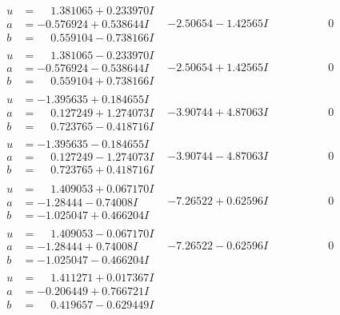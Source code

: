 \documentclass[1p]{elsarticle_modified}
\theoremstyle{definition}
\begin{document}
$$\begin{array}{c|c|c}
\begin{aligned}
u &= \phantom{-}1.381065 + 0.233970 I \\
a &= -0.576924 + 0.538644 I \\
b &= \phantom{-}0.559104 - 0.738166 I\end{aligned}
 & -2.50654 - 1.42565 I & \phantom{-0.000000 } 0 \\ \hline\begin{aligned}
u &= \phantom{-}1.381065 - 0.233970 I \\
a &= -0.576924 - 0.538644 I \\
b &= \phantom{-}0.559104 + 0.738166 I\end{aligned}
 & -2.50654 + 1.42565 I & \phantom{-0.000000 } 0 \\ \hline\begin{aligned}
u &= -1.395635 + 0.184655 I \\
a &= \phantom{-}0.127249 + 1.274073 I \\
b &= \phantom{-}0.723765 - 0.418716 I\end{aligned}
 & -3.90744 + 4.87063 I & \phantom{-0.000000 } 0 \\ \hline\begin{aligned}
u &= -1.395635 - 0.184655 I \\
a &= \phantom{-}0.127249 - 1.274073 I \\
b &= \phantom{-}0.723765 + 0.418716 I\end{aligned}
 & -3.90744 - 4.87063 I & \phantom{-0.000000 } 0 \\ \hline\begin{aligned}
u &= \phantom{-}1.409053 + 0.067170 I \\
a &= -1.28444 - 0.74008 I \\
b &= -1.025047 + 0.466204 I\end{aligned}
 & -7.26522 + 0.62596 I & \phantom{-0.000000 } 0 \\ \hline\begin{aligned}
u &= \phantom{-}1.409053 - 0.067170 I \\
a &= -1.28444 + 0.74008 I \\
b &= -1.025047 - 0.466204 I\end{aligned}
 & -7.26522 - 0.62596 I & \phantom{-0.000000 } 0 \\ \hline\begin{aligned}
u &= \phantom{-}1.411271 + 0.017367 I \\
a &= -0.206449 + 0.766721 I \\
b &= \phantom{-}0.419657 - 0.629449 I\end{aligned}

\end{array}$$
\end{document}
